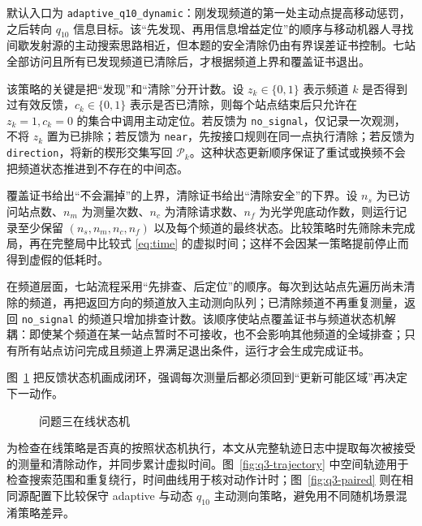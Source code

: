 默认入口为 \texttt{adaptive\_q10\_dynamic}：刚发现频道的第一处主动点提高移动惩罚，之后转向 $q_{10}$ 信息目标。该“先发现、再用信息增益定位”的顺序与移动机器人寻找间歇发射源的主动搜索思路相近\cite{song}，但本题的安全清除仍由有界误差证书控制。七站全部访问且所有已发现频道已清除后，才根据频道上界和覆盖证书退出。

该策略的关键是把“发现”和“清除”分开计数。设 $z_k\in\{0,1\}$ 表示频道 $k$ 是否得到过有效反馈，$c_k\in\{0,1\}$ 表示是否已清除，则每个站点结束后只允许在 $z_k=1,c_k=0$ 的集合中调用主动定位。若反馈为 \texttt{no\_signal}，仅记录一次观测，不将 $z_k$ 置为已排除；若反馈为 \texttt{near}，先按接口规则在同一点执行清除；若反馈为 \texttt{direction}，将新的楔形交集写回 $\mathcal P_k$。这种状态更新顺序保证了重试或换频不会把频道状态推进到不存在的中间态。

覆盖证书给出“不会漏掉”的上界，清除证书给出“清除安全”的下界。设 $n_s$ 为已访问站点数、$n_m$ 为测量次数、$n_c$ 为清除请求数、$n_f$ 为光学兜底动作数，则运行记录至少保留 $(n_s,n_m,n_c,n_f)$ 以及每个频道的最终状态。比较策略时先筛除未完成局，再在完整局中比较式 \eqref{eq:time} 的虚拟时间；这样不会因某一策略提前停止而得到虚假的低耗时。

在频道层面，七站流程采用“先排查、后定位”的顺序。每次到达站点先遍历尚未清除的频道，再把返回方向的频道放入主动测向队列；已清除频道不再重复测量，返回 \texttt{no\_signal} 的频道只增加排查计数。该顺序使站点覆盖证书与频道状态机解耦：即使某个频道在某一站点暂时不可接收，也不会影响其他频道的全域排查；只有所有站点访问完成且频道上界满足退出条件，运行才会生成完成证书。

图~\ref{fig:q3-state} 把反馈状态机画成闭环，强调每次测量后都必须回到“更新可能区域”再决定下一动作。

\begin{figure}[H]\centering
{}
\caption{问题三在线状态机}\label{fig:q3-state}
\end{figure}

为检查在线策略是否真的按照状态机执行，本文从完整轨迹日志中提取每次被接受的测量和清除动作，并同步累计虚拟时间。图~\ref{fig:q3-trajectory} 中空间轨迹用于检查搜索范围和重复绕行，时间曲线用于核对动作计时；图~\ref{fig:q3-paired} 则在相同源配置下比较保守 adaptive 与动态 $q_{10}$ 主动测向策略，避免用不同随机场景混淆策略差异。

